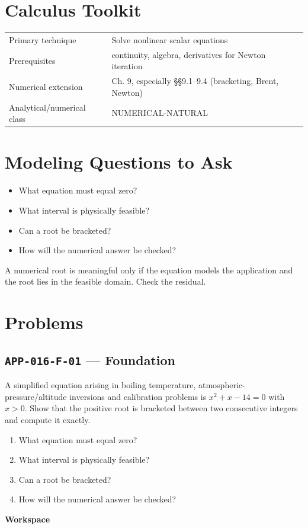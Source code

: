 \documentclass[11pt]{book}
\newcommand{\pid}[1]{\texttt{#1}}
\newcommand{\workspace}{\par\vspace{0.7in}\hrulefill\par\vspace{0.55in}\hrulefill\par}
\begin{document}
\section*{Calculus Toolkit}
\begin{tabularx}{\textwidth}{@{}lX@{}}\toprule
Primary technique & Solve nonlinear scalar equations \\
Prerequisites & continuity, algebra, derivatives for Newton iteration \\
Numerical extension & Ch. 9, especially §§9.1–9.4 (bracketing, Brent, Newton) \\
Analytical/numerical class & NUMERICAL-NATURAL \\
\bottomrule\end{tabularx}
\section*{Modeling Questions to Ask}\begin{itemize}
\item What equation must equal zero?
\item What interval is physically feasible?
\item Can a root be bracketed?
\item How will the numerical answer be checked?
\end{itemize}
\begin{errorbox}A numerical root is meaningful only if the equation models the application and the root lies in the feasible domain. Check the residual.\end{errorbox}
\section*{Problems}
\subsection*{\pid{APP-016-F-01} — Foundation}
\begin{problembox}
A simplified equation arising in boiling temperature, atmospheric-pressure/altitude inversions and calibration problems is $x^2+x-14=0$ with $x>0$. Show that the positive root is bracketed between two consecutive integers and compute it exactly.
\end{problembox}
\begin{promptbox}\begin{enumerate}
\item What equation must equal zero?
\item What interval is physically feasible?
\item Can a root be bracketed?
\item How will the numerical answer be checked?
\end{enumerate}\end{promptbox}
\textbf{Workspace}\workspace
{}
\end{document}
